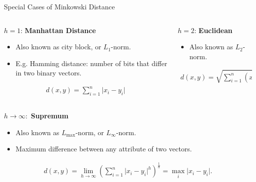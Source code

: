 \begin{frame}{Special Cases of Minkowski Distance}
	\begin{columns}
		\begin{column}{0.45\textwidth}
			$h=1$: \textbf{Manhattan Distance}
			\begin{itemize}
				\item Also known as city block, or $L_1$-norm.
				\item E.g. Hamming distance: number of bits that differ in two binary
				      vectors.
			\end{itemize}
			\vspace*{-1em}
			\begin{align*}
				d(x,y) = \sum_{i=1}^{n} \vert x_i - y_i \vert
			\end{align*}
		\end{column}

		\begin{column}{0.45\textwidth}
			$h=2$: \textbf{Euclidean}
			\begin{itemize}
				\item Also known as $L_2$-norm.
			\end{itemize}
			\vspace*{-1em}
			\begin{align*}
				d(x,y) = \sqrt{\sum_{i=1}^{n} (x_i-y_i)^2}.
			\end{align*}
		\end{column}

	\end{columns}

	\vspace*{0.1cm}


	$h \rightarrow \infty:$ \textbf{Supremum}
	\begin{itemize}
		\item Also known as $L_{\text{max}}$-norm, or $L_\infty$-norm.
		\item Maximum difference between any attribute of two vectors.
	\end{itemize}
	\vspace*{-1em}
	\begin{align*}
		d(x,y) = \lim_{h \rightarrow \infty} \left( \sum_{i=1}^{n} \vert x_i - y_i \vert^{h} \right)^{\frac{1}{h}} = \max_i \vert x_i-y_i \vert.
	\end{align*}

\end{frame}


